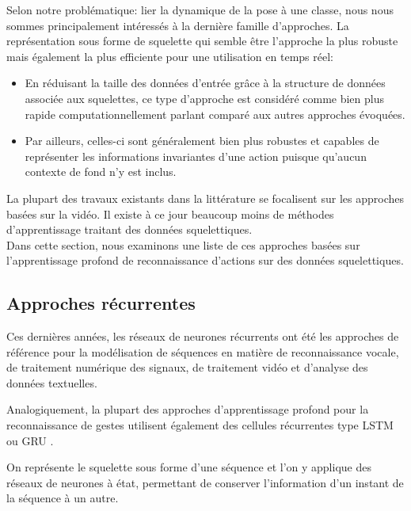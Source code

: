Selon notre problématique: lier la dynamique de la pose à une classe, nous nous sommes principalement intéressés à la dernière famille d'approches. La représentation sous forme de squelette qui semble être l'approche la plus robuste mais également la plus efficiente pour une utilisation en temps réel:

\begin{itemize}
    \item En réduisant la taille des données d'entrée grâce à la structure de données associée aux squelettes, ce type d'approche est considéré comme bien plus rapide computationnellement parlant comparé aux autres approches évoquées.
    \item Par ailleurs, celles-ci sont généralement bien plus robustes et capables de représenter les informations invariantes d'une action puisque qu'aucun contexte de fond n'y est inclus.
\end{itemize}

La plupart des travaux existants dans la littérature se focalisent sur les approches basées sur la vidéo. Il existe à ce jour beaucoup moins de méthodes d'apprentissage traitant des données squelettiques.\\

Dans cette section, nous examinons une liste de ces approches basées sur l'apprentissage profond de reconnaissance d'actions sur des données squelettiques.

\subsection{Approches récurrentes}

Ces dernières années, les réseaux de neurones récurrents ont  été les approches de référence pour la modélisation de séquences en matière de reconnaissance vocale, de traitement numérique des signaux, de traitement vidéo et d'analyse des données textuelles. 


Analogiquement, la plupart des approches d'apprentissage profond pour la reconnaissance de gestes utilisent également des cellules récurrentes type LSTM\\ \cite{hochreiter1997long} ou GRU \cite{2014arXiv1406.1078C}.

On représente le squelette sous forme d’une séquence et l'on y applique des réseaux de neurones à état, permettant de conserver l’information d’un instant de la séquence à un autre.

